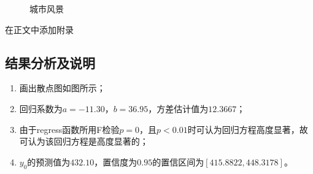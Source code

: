 \documentclass[UTF8,12pt,a4paper]{article}
\begin{document}
\begin{figure}[htbp]
	\quad
	\caption{城市风景}
\end{figure}

\begin{appendices}
在正文中添加附录
\end{appendices}

\subsection{结果分析及说明}
\begin{enumerate}
	\item 画出散点图如图所示；
	\item 回归系数为$a=-11.30$，$b=36.95$，方差估计值为$12.3667$；
	\item 由于regress函数所用F检验$p=0$，且$p<0.01$时可认为回归方程高度显著，故可认为该回归方程是高度显著的；
	\item $y_0$的预测值为$432.10$，置信度为$0.95$的置信区间为$[415.8822,448.3178]$。
\end{enumerate}
\end{document}
